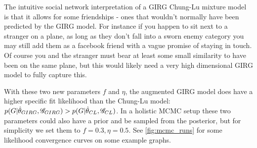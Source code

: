The intuitive social network interpretation of a GIRG Chung-Lu mixture model is that it allows for some  friendships - ones that wouldn't normally have been predicted by the GIRG model. For instance if you happen to sit next to a stranger on a plane, as long as they don't fall into a sworn enemy category you may still add them as a facebook friend with a vague promise of staying in touch. Of course you and the stranger must bear at least some small similarity to have been on the same plane, but this would likely need a very high dimensional GIRG model to fully capture this. 


With these two new parameters $f$ and $\eta$, the augmented GIRG model does have a higher specific fit likelihood than the Chung-Lu model: $p(G | \hat{\theta}_{GIRG}, \mathscr{G}_{GIRG}) > p(G | \hat{\theta}_{CL}, \mathscr{G}_{CL})$. In a holistic MCMC setup these two parameters could also have a prior and be sampled from the posterior, but for simplicity we set them to $f=0.3, \eta=0.5$. See \cref{fig:mcmc_runs} for some likelihood convergence curves on some example graphs.





